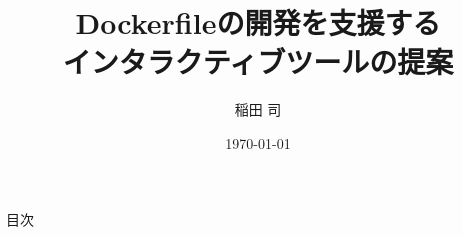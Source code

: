 \documentclass[dvipdfmx, 12pt]{beamer}
\title{Dockerfileの開発を支援する\\インタラクティブツールの提案}
\author{稲田 司}
\institute{\small 鵜林・亀井研究室}
\date{\today}
\begin{document}
\frame{\maketitle}

\begin{frame}{目次}
    \tableofcontents
\end{frame}








\end{document}

